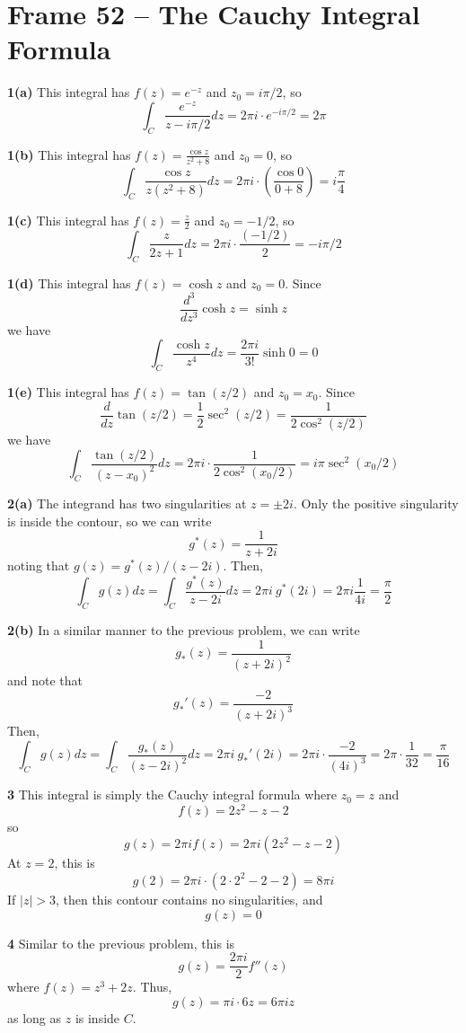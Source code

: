 \documentclass{article}
\begin{document}
\clearpage
\section{Frame 52 -- The Cauchy Integral Formula}
\textbf{1(a)}
This integral has $f(z) = e^{-z}$ and $z_0 = i\pi/2$, so
\[
	\int_C \frac{e^{-z}}{z - i\pi/2} dz
	= 2\pi i \cdot e^{-i\pi/2}
	= 2\pi
\]

\textbf{1(b)}
This integral has $f(z) = \frac{\cos z}{z^2 + 8}$ and $z_0 = 0$, so
\[
	\int_C \frac{\cos z}{z(z^2 + 8)} dz
	= 2\pi i \cdot \left( \frac{\cos 0}{0 + 8} \right)
	= i \frac{\pi}{4}
\]

\textbf{1(c)}
This integral has $f(z) = \frac{z}{2}$ and $z_0 = -1/2$, so
\[
	\int_C \frac{z}{2z + 1} dz
	= 2\pi i \cdot \frac{(-1/2)}{2}
	= -i \pi/2
\]

\textbf{1(d)}
This integral has $f(z) = \cosh z$ and $z_0 = 0$. Since
\[
	\frac{d^3}{dz^3} \cosh z = \sinh z
\]
we have
\[
	\int_C \frac{\cosh z}{z^4} dz
	= \frac{2\pi i}{3!} \sinh 0
	= 0
\]

\textbf{1(e)}
This integral has $f(z) = \tan(z/2)$ and $z_0 = x_0$. Since
\[
	\frac{d}{dz} \tan(z / 2)
	= \frac{1}{2} \sec^2(z / 2)
	= \frac{1}{2 \cos^2(z / 2)}
\]	
we have
\[
	\int_C \frac{\tan(z/2)}{(z - x_0)^2} dz
	= 2\pi i \cdot \frac{1}{2 \cos^2(x_0 / 2)}
	= i \pi \sec^2(x_0 / 2)
\]

\textbf{2(a)}
The integrand has two singularities at $z = \pm 2i$. Only the positive singularity is inside the contour, so we can write
\[
	g^*(z) = \frac{1}{z + 2i}
\]
noting that $g(z) = g^*(z) / (z - 2i)$. Then,
\[
	\int_C g(z) dz
	= \int_C \frac{g^*(z)}{z - 2i} dz
	= 2\pi i ~ g^*(2i)
	= 2\pi i \frac{1}{4i}
	= \frac{\pi}{2}
\]

\textbf{2(b)}
In a similar manner to the previous problem, we can write
\[
	g_*(z) = \frac{1}{(z + 2i)^2}
\]
and note that
\[
	g_*'(z) = \frac{-2}{(z + 2i)^3}
\]
Then,
\[
	\int_C g(z) dz
	= \int_C \frac{g_*(z)}{(z - 2i)^2} dz
	= 2 \pi i ~ g_*'(2i)
	= 2 \pi i \cdot \frac{-2}{(4i)^3}
	= 2\pi \cdot \frac{1}{32}
	= \frac{\pi}{16}
\]

\textbf{3}
This integral is simply the Cauchy integral formula where $z_0 = z$ and 
\[
	f(z) = 2z^2 - z - 2
\]
so
\[
	g(z) = 2\pi i f(z) = 2\pi i(2z^2 - z - 2)
\]
At $z = 2$, this is
\[
	g(2) = 2\pi i \cdot (2 \cdot 2^2 - 2 - 2) = 8\pi i
\]
If $|z|> 3$, then this contour contains no singularities, and
\[
	g(z) = 0
\]

\textbf{4}
Similar to the previous problem, this is
\[
	g(z) = \frac{2\pi i}{2} f''(z)
\]
where $f(z) = z^3 + 2z$. Thus,
\[
	g(z) = \pi i \cdot 6z = 6\pi i z
\]
as long as $z$ is inside $C$.
\end{document}
